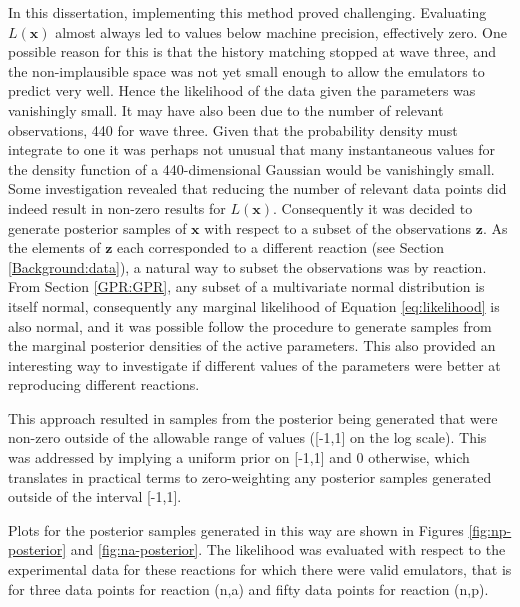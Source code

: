 \documentclass[
  12pt,
  a4paper,
  twoside]{book}
\begin{document}
In this dissertation, implementing this method proved challenging. Evaluating \(L(\mathbf{x})\) almost always led to values below machine precision, effectively zero. One possible reason for this is that the history matching stopped at wave three, and the non-implausible space was not yet small enough to allow the emulators to predict very well. Hence the likelihood of the data given the parameters was vanishingly small. It may have also been due to the number of relevant observations, 440 for wave three. Given that the probability density must integrate to one it was perhaps not unusual that many instantaneous values for the density function of a 440-dimensional Gaussian would be vanishingly small. Some investigation revealed that reducing the number of relevant data points did indeed result in non-zero results for \(L(\mathbf{x})\). Consequently it was decided to generate posterior samples of \(\mathbf{x}\) with respect to a subset of the observations \(\mathbf{z}\). As the elements of \(\mathbf{z}\) each corresponded to a different reaction (see Section \ref{Background:data}), a natural way to subset the observations was by reaction. From Section \ref{GPR:GPR}, any subset of a multivariate normal distribution is itself normal, consequently any marginal likelihood of Equation \eqref{eq:likelihood} is also normal, and it was possible follow the procedure to generate samples from the marginal posterior densities of the active parameters. This also provided an interesting way to investigate if different values of the parameters were better at reproducing different reactions.

This approach resulted in samples from the posterior being generated that were non-zero outside of the allowable range of values ({[}-1,1{]} on the log scale). This was addressed by implying a uniform prior on {[}-1,1{]} and 0 otherwise, which translates in practical terms to zero-weighting any posterior samples generated outside of the interval {[}-1,1{]}.

Plots for the posterior samples generated in this way are shown in Figures \ref{fig:np-posterior} and \ref{fig:na-posterior}. The likelihood was evaluated with respect to the experimental data for these reactions for which there were valid emulators, that is for three data points for reaction (n,a) and fifty data points for reaction (n,p).
\end{document}
